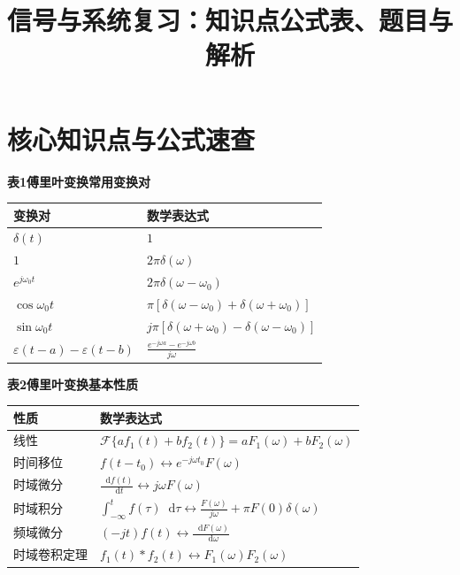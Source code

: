 \documentclass[12pt,a4paper]{ctexart}
\newcommand{\eps}{\varepsilon}
\newcommand{\dif}{\mathop{}\!\mathrm{d}}
\begin{document}
\title{\heiti 信号与系统复习：知识点公式表、题目与解析}
\author{}
\date{}


\newpage
\section{核心知识点与公式速查}
\par\bigskip
\noindent\textbf{表1\quad 傅里叶变换常用变换对}
\vspace{0.4em}

\begin{tabular}{p{}p{}}
\toprule
\textbf{变换对} & \textbf{数学表达式}\\
\midrule
$\displaystyle\delta(t)$ & $1$\\[0.35em]
$\displaystyle1$ & $2\pi\delta(\omega)$\\[0.35em]
$\displaystyle e^{j\omega_0t}$ & $2\pi\delta(\omega-\omega_0)$\\[0.35em]
$\displaystyle\cos\omega_0t$ & $\pi[\delta(\omega-\omega_0)+\delta(\omega+\omega_0)]$\\[0.35em]
$\displaystyle\sin\omega_0t$ & $j\pi[\delta(\omega+\omega_0)-\delta(\omega-\omega_0)]$\\[0.35em]
$\displaystyle\eps(t-a)-\eps(t-b)$ & $\displaystyle\frac{e^{-j\omega a}-e^{-j\omega b}}{j\omega}$\\
\bottomrule
\end{tabular}

\par\bigskip
\noindent\textbf{表2\quad 傅里叶变换基本性质}
\vspace{0.4em}

\begin{tabular}{p{}p{}}
\toprule
\textbf{性质} & \textbf{数学表达式}\\
\midrule
线性 & $\displaystyle\mathcal F\{af_1(t)+bf_2(t)\}=aF_1(\omega)+bF_2(\omega)$\\[0.35em]
时间移位 & $\displaystyle f(t-t_0)\longleftrightarrow e^{-j\omega t_0}F(\omega)$\\[0.35em]
时域微分 & $\displaystyle\frac{\dif f(t)}{\dif t}\longleftrightarrow j\omega F(\omega)$\\[0.35em]
时域积分 & $\displaystyle\int_{-\infty}^{t}f(\tau)\dif\tau\longleftrightarrow\frac{F(\omega)}{j\omega}+\pi F(0)\delta(\omega)$\\[0.35em]
频域微分 & $\displaystyle(-jt)f(t)\longleftrightarrow\frac{\dif F(\omega)}{\dif\omega}$\\[0.35em]
时域卷积定理 & $\displaystyle f_1(t)*f_2(t)\longleftrightarrow F_1(\omega)F_2(\omega)$\\
\bottomrule
\end{tabular}
\end{document}
